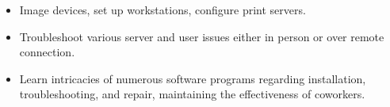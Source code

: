 \documentclass[11pt]{article}
\begin{document}
{%
    \begin{itemize}[noitemsep,nolistsep]
        \item Image devices, set up workstations, configure print servers. 
        \item Troubleshoot various server and user issues either in person or over remote connection.
        \item Learn intricacies of numerous software programs regarding installation, troubleshooting, and repair, maintaining the effectiveness of coworkers. 
    \end{itemize}
    \vspace{3mm}

\vspace{-2mm}
\hsep


}
\end{document}
